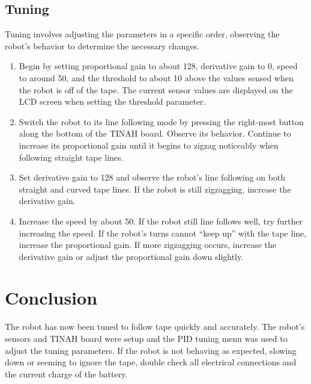 \documentclass[11pt]{article}
\begin{document}
\begin{adjustwidth}{1cm}{}
\begin{itemize}
	\end{itemize}	

\subsection{Tuning}
	
	Tuning involves adjusting the parameters in a specific order, observing the robot's behavior to determine the necessary changes.
	
	\begin{enumerate}
	
	 	\item Begin by setting proportional gain to about 128, derivative gain to 0, speed to around 50, and the threshold to about 10 above the values sensed when the robot is off of the tape.  The current sensor values are displayed on the LCD screen when setting the threshold parameter.
	 	
	 	\item Switch the robot to its line following mode by pressing the right-most button along the bottom of the TINAH board.  Observe its behavior.  Continue to increase its proportional gain until it begins to zigzag noticeably when following straight tape lines.
	 	
	 	\item Set derivative gain to 128 and observe the robot's line following on both straight and curved tape lines.  If the robot is still zigzagging, increase the derivative gain.
	 	
	 	\item Increase the speed by about 50.  If the robot still line follows well, try further increasing the speed.  If the robot's turns cannot ``keep up'' with the tape line, increase the proportional gain.  If more zigzagging occurs, increase the derivative gain or adjust the proportional gain down slightly.

	\end{enumerate}

\end{adjustwidth}	

\section{Conclusion}

The robot has now been tuned to follow tape quickly and accurately.  The robot's sensors and TINAH board were setup and the PID tuning menu was used to adjust the tuning parameters.  If the robot is not behaving as expected, slowing down or seeming to ignore the tape, double check all electrical connections and the current charge of the battery.
\end{document}
